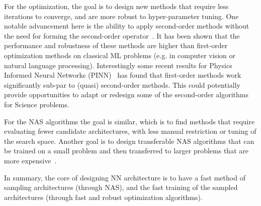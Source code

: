 For the optimization, the goal is to design new methods that require less iterations to converge, and are
more robust to hyper-parameter tuning.
One notable advancement here is the ability to apply second-order methods
without the need for forming the second-order operator~\cite{yao2020adahessian,yao2019pyhessian,gupta2018shampoo,reddi2018adaptive}.
It has been shown that the performance and robustness of these methods are higher than
first-order optimization methods on classical ML problems (e.g. in computer vision or natural language processing).
Interestingly some recent results for Physics Informed Neural Networks (PINN)~\cite{raissi2019physics} has
found that first-order methods work significantly sub-par to (quasi) second-order methods.
This could potentially provide opportunities to adapt or redesign some of the second-order algorithms for Science problems.

For the NAS algorithms the goal is similar, which is to find methods
that require evaluating fewer candidate architectures, with less manual restriction or tuning
of the search space.
Another goal is to design transferable NAS algorithms that can be trained on a small problem
and then transferred to larger problems that are more expensive~\cite{cai2018proxylessnas,cai2019once}.

In summary, the core of designing NN architecture is to have a fast method of sampling architectures (through NAS),
and the fast training of the sampled architectures (through fast and robust optimization algorithms).




